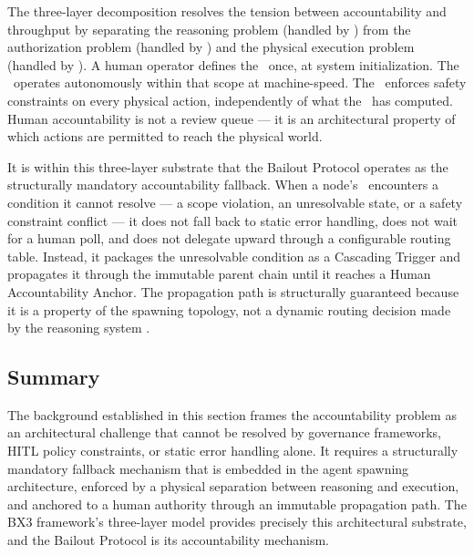 The three-layer decomposition resolves the tension between accountability and throughput by separating the reasoning problem (handled by \bounds) from the authorization problem (handled by \purpose) and the physical execution problem (handled by \fact). A human operator defines the \purpose\ once, at system initialization. The \bounds\ operates autonomously within that scope at machine-speed. The \fact\ enforces safety constraints on every physical action, independently of what the \bounds\ has computed. Human accountability is not a review queue — it is an architectural property of which actions are permitted to reach the physical world.

It is within this three-layer substrate that the Bailout Protocol operates as the structurally mandatory accountability fallback. When a node's \bounds\ encounters a condition it cannot resolve — a scope violation, an unresolvable state, or a safety constraint conflict — it does not fall back to static error handling, does not wait for a human poll, and does not delegate upward through a configurable routing table. Instead, it packages the unresolvable condition as a Cascading Trigger and propagates it through the immutable parent chain until it reaches a Human Accountability Anchor. The propagation path is structurally guaranteed because it is a property of the spawning topology, not a dynamic routing decision made by the reasoning system \cite{wiener1948}.

\subsection{Summary}

The background established in this section frames the accountability problem as an architectural challenge that cannot be resolved by governance frameworks, HITL policy constraints, or static error handling alone. It requires a structurally mandatory fallback mechanism that is embedded in the agent spawning architecture, enforced by a physical separation between reasoning and execution, and anchored to a human authority through an immutable propagation path. The BX3 framework's three-layer model \cite{tristr81} provides precisely this architectural substrate, and the Bailout Protocol is its accountability mechanism.